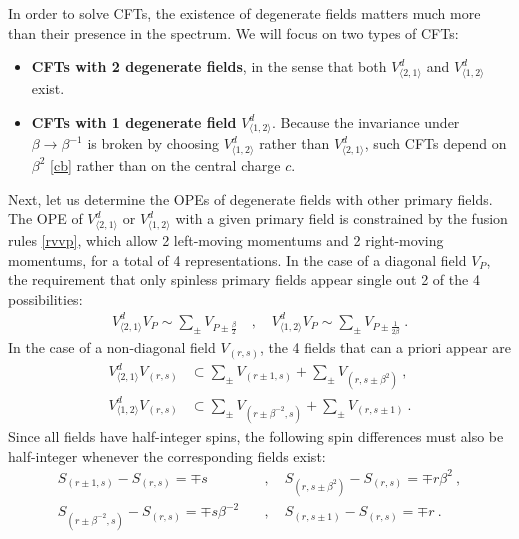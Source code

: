 \documentclass[12pt, a4paper]{article}
\newcommand{\myindex}[1]{\textbf{\boldmath #1}}
\theoremstyle{break}
\begin{document}
In order to solve CFTs, the existence of degenerate fields matters much more than their presence in the spectrum. We will focus on two types of CFTs:
\begin{itemize}
 \item \myindex{CFTs with 2 degenerate fields}, in the sense that both $V^d_{\langle 2,1\rangle}$ and $V^d_{\langle 1,2\rangle}$ exist. 
 \item \myindex{CFTs with 1 degenerate field} $V^d_{\langle 1,2\rangle}$. Because the invariance under $\beta\to \beta^{-1}$ is broken by choosing $V^d_{\langle 1,2\rangle}$ rather than $V^d_{\langle 2,1\rangle}$, such CFTs depend on $\beta^2$ \eqref{cb} rather than on the central charge $c$. 
\end{itemize}
Next, let us determine the OPEs of degenerate fields with other primary fields.
The OPE of $V^d_{\langle 2,1\rangle}$ or $V^d_{\langle 1,2\rangle}$ with a given primary field is constrained by the fusion rules \eqref{rvvp}, which allow 2 left-moving momentums and 2 right-moving momentums, for a total of 4 representations.  In the case of a diagonal field $V_P$, the requirement that only spinless primary fields appear single out 2 of the 4 possibilities:
\begin{align}
 \boxed{V^d_{\langle 2,1\rangle} V_P \sim \sum_\pm V_{P\pm\frac{\beta}{2}}} \quad , \quad \boxed{V^d_{\langle 1,2\rangle} V_P \sim \sum_\pm V_{P\pm\frac{1}{2\beta}}} \ . 
 \label{vpope}
\end{align}
In the case of a non-diagonal field $V_{(r,s)}$, the 4 fields that can a priori appear are
\begin{align}
 V^d_{\langle 2,1\rangle}V_{(r,s)} &\subset \sum_\pm V_{(r\pm 1,s)} + \sum_\pm V_{(r,s\pm \beta^2)}\ ,
 \label{vtovrs}
 \\
 V^d_{\langle 1,2\rangle}V_{(r,s)} &\subset \sum_\pm V_{(r\pm \beta^{-2},s)} + \sum_\pm V_{(r,s\pm 1)}\ .
 \label{votvrs}
\end{align}
Since all fields have half-integer spins, the following spin differences must also be half-integer whenever the corresponding fields exist: 
\begin{align}
 S_{(r\pm 1,s)} - S_{(r,s)} = \mp s &\quad , \quad S_{(r,s\pm \beta^2)} - S_{(r,s)} = \mp r\beta^2\ ,
 \label{sdiff1}
 \\
 S_{(r\pm \beta^{-2},s)} - S_{(r,s)} = \mp s\beta^{-2} &\quad , \quad S_{(r,s\pm 1)} - S_{(r,s)} = \mp r\ . 
 \label{sdiff2}
\end{align}
\end{document}
